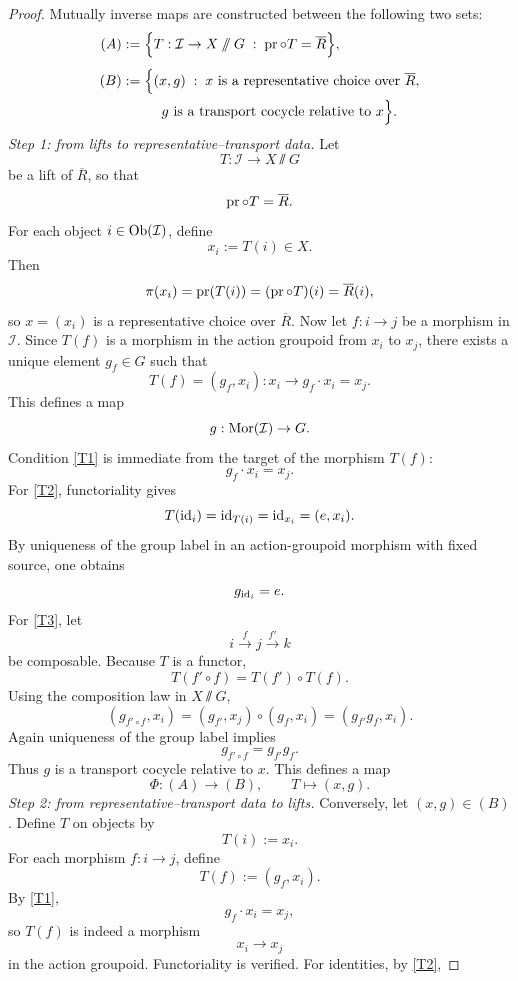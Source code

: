 \begin{proof}
	Mutually inverse maps are constructed between the following two sets:
	\begin{align*}
		(A) & :=\Bigl\{
		T:\mathcal I\to X\mathbin{/\mkern-6mu/} G \;:\; \operatorname{pr}\circ T=\overline R
		\Bigr\},                                                          \\[1ex]
		(B) & :=\Bigl\{
		(x,g)\;:\; x \text{ is a representative choice over }\overline R, \\
		    & \hspace{2.85em}
		g \text{ is a transport cocycle relative to }x
		\Bigr\}.
	\end{align*}
	\smallskip
	\noindent
	\emph{Step 1: from lifts to representative--transport data.}
	Let
	\[
		T:\mathcal I\to X\sslash G
	\]
	be a lift of \(\overline R\), so that
	\[
		\operatorname{pr}\circ T=\overline R.
	\]
	For each object \(i\in\operatorname{Ob}(\mathcal I)\), define
	\[
		x_i:=T(i)\in X.
	\]
	Then
	\[
		\pi(x_i)=\operatorname{pr}(T(i))=(\operatorname{pr}\circ T)(i)=\overline R(i),
	\]
	so \(x=(x_i)\) is a representative choice over \(\overline R\).
	Now let \(f:i\to j\) be a morphism in \(\mathcal I\).
	Since \(T(f)\) is a morphism in the action groupoid from \(x_i\) to
	\(x_j\), there exists a unique element \(g_f\in G\) such that
	\[
		T(f)=(g_f,x_i):x_i\to g_f\cdot x_i=x_j.
	\]
	This defines a map
	\[
		g:\mathrm{Mor}(\mathcal I)\to G.
	\]
	Condition \textup{\ref{T1}} is immediate from the target of the morphism
	\(T(f)\):
	\[
		g_f\cdot x_i=x_j.
	\]
	For \textup{\ref{T2}}, functoriality gives
	\[
		T(\operatorname{id}_i)=\operatorname{id}_{T(i)}=\operatorname{id}_{x_i}=(e,x_i).
	\]
	By uniqueness of the group label in an action-groupoid morphism with
	fixed source, one obtains
	\[
		g_{\operatorname{id}_i}=e.
	\]
	For \textup{\ref{T3}}, let
	\[
		i\xrightarrow{f}j\xrightarrow{f'}k
	\]
	be composable.
	Because \(T\) is a functor,
	\[
		T(f'\circ f)=T(f')\circ T(f).
	\]
	Using the composition law in \(X\sslash G\),
	\[
		(g_{f'\circ f},x_i)
		=
		(g_{f'},x_j)\circ(g_f,x_i)
		=
		(g_{f'}g_f,x_i).
	\]
	Again uniqueness of the group label implies
	\[
		g_{f'\circ f}=g_{f'}g_f.
	\]
	Thus \(g\) is a transport cocycle relative to \(x\).
	This defines a map
	\[
		\Phi:(A)\to(B),
		\qquad
		T\mapsto (x,g).
	\]
	\smallskip
	\noindent
	\emph{Step 2: from representative--transport data to lifts.}
	Conversely, let \((x,g)\in(B)\).
	Define \(T\) on objects by
	\[
		T(i):=x_i.
	\]
	For each morphism \(f:i\to j\), define
	\[
		T(f):=(g_f,x_i).
	\]
	By \textup{\ref{T1}},
	\[
		g_f\cdot x_i=x_j,
	\]
	so \(T(f)\) is indeed a morphism
	\[
		x_i\to x_j
	\]
	in the action groupoid.
	Functoriality is verified.
	For identities, by \textup{\ref{T2}},

\end{proof}
